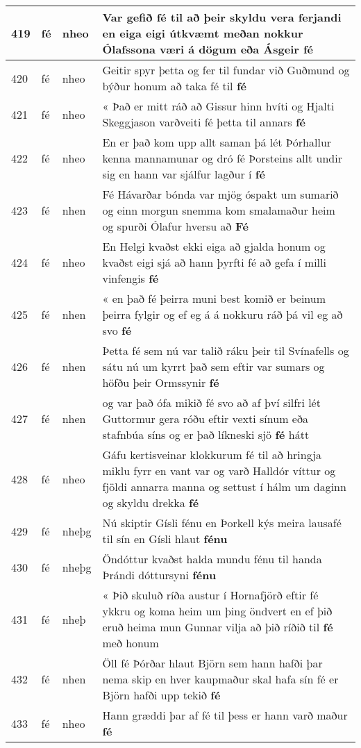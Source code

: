 \documentclass{article}
\begin{document}
\begin{longtable}{p{1cm}|p{1cm}|p{1cm}|p{13cm}}
\hline
419&fé&nheo&Var gefið fé til að þeir skyldu vera ferjandi en eiga eigi útkvæmt meðan nokkur Ólafssona væri á dögum eða Ásgeir \textbf{fé} \\
\hline
420&fé&nheo&Geitir spyr þetta og fer til fundar við Guðmund og býður honum að taka fé til \textbf{fé} \\
\hline
421&fé&nheo&« Það er mitt ráð að Gissur hinn hvíti og Hjalti Skeggjason varðveiti fé þetta til annars \textbf{fé} \\
\hline
422&fé&nheo&En er það kom upp allt saman þá lét Þórhallur kenna mannamunar og dró fé Þorsteins allt undir sig en hann var sjálfur lagður í \textbf{fé} \\
\hline
423&fé&nhen&Fé Hávarðar bónda var mjög óspakt um sumarið og einn morgun snemma kom smalamaður heim og spurði Ólafur hversu að \textbf{Fé} \\
\hline
424&fé&nheo&En Helgi kvaðst ekki eiga að gjalda honum og kvaðst eigi sjá að hann þyrfti fé að gefa í milli vinfengis \textbf{fé} \\
\hline
425&fé&nhen&« en það fé þeirra muni best komið er beinum þeirra fylgir og ef eg á á nokkuru ráð þá vil eg að svo \textbf{fé} \\
\hline
426&fé&nhen&Þetta fé sem nú var talið ráku þeir til Svínafells og sátu nú um kyrrt það sem eftir var sumars og höfðu þeir Ormssynir \textbf{fé} \\
\hline
427&fé&nhen&og var það ófa mikið fé svo að af því silfri lét Guttormur gera róðu eftir vexti sínum eða stafnbúa síns og er það líkneski sjö \textbf{fé} hátt\\
\hline
428&fé&nheo&Gáfu kertisveinar klokkurum fé til að hringja miklu fyrr en vant var og varð Halldór víttur og fjöldi annarra manna og settust í hálm um daginn og skyldu drekka \textbf{fé} \\
\hline
429&fé&nheþg&Nú skiptir Gísli fénu en Þorkell kýs meira lausafé til sín en Gísli hlaut \textbf{fénu} \\
\hline
430&fé&nheþg&Öndóttur kvaðst halda mundu fénu til handa Þrándi dóttursyni \textbf{fénu} \\
\hline
431&fé&nheþ&« Þið skuluð ríða austur í Hornafjörð eftir fé ykkru og koma heim um þing öndvert en ef þið eruð heima mun Gunnar vilja að þið ríðið til \textbf{fé} með honum\\
\hline
432&fé&nhen&Öll fé Þórðar hlaut Björn sem hann hafði þar nema skip en hver kaupmaður skal hafa sín fé er Björn hafði upp tekið \textbf{fé} \\
\hline
433&fé&nheo&Hann græddi þar af fé til þess er hann varð maður \textbf{fé} \\

\end{longtable}
\end{document}
